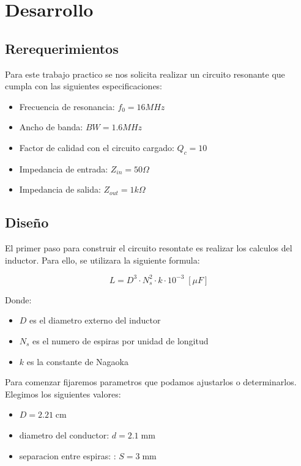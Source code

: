 \section{Desarrollo}

\subsection{Rerequerimientos}

Para este trabajo practico se nos solicita realizar un circuito resonante que cumpla con las siguientes especificaciones:

\begin{itemize}
    \item Frecuencia de resonancia: $f_0 = 16 MHz$
    \item Ancho de banda: $BW = 1.6 MHz$
    \item Factor de calidad con el circuito cargado: $Q_c = 10$
    \item Impedancia de entrada: $Z_{in} = 50 \Omega$
    \item Impedancia de salida: $Z_{out} = 1 k\Omega$
\end{itemize}

\subsection{Diseño}

El primer paso para construir el circuito resontate es realizar los calculos del inductor. Para ello, se utilizara la siguiente formula:

\begin{equation}
    L = D^3 \cdot N_s^2 \cdot k \cdot 10^{-3}\; [\mu F]
\end{equation}

Donde:

\begin{itemize}
    \item $D$ es el diametro externo del inductor
    \item $N_s$ es el numero de espiras por unidad de longitud
    \item $k$ es la constante de Nagaoka
\end{itemize}

Para comenzar fijaremos parametros que podamos ajustarlos o determinarlos. Elegimos los siguientes valores:

\begin{itemize}
    \item $D =  2.21\; \text{cm}$
    \item diametro del conductor: $d = 2.1\; \text{mm}$
    \item separacion entre espiras: : $S = 3\; \text{mm}$
\end{itemize}

